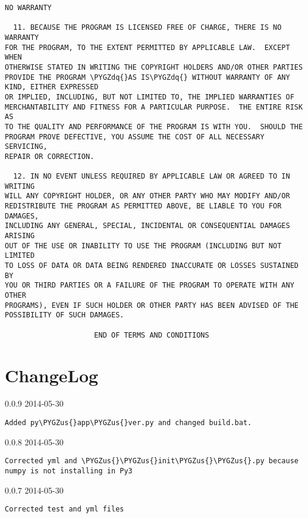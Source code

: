 \documentclass[letterpaper,10pt,english]{sphinxmanual}
\def\PYGZus{\char`\_}
\def\PYGZdq{\char`\"}
\begin{document}
\begin{Verbatim}[commandchars=\\\{\}]
                            NO WARRANTY

  11. BECAUSE THE PROGRAM IS LICENSED FREE OF CHARGE, THERE IS NO WARRANTY
FOR THE PROGRAM, TO THE EXTENT PERMITTED BY APPLICABLE LAW.  EXCEPT WHEN
OTHERWISE STATED IN WRITING THE COPYRIGHT HOLDERS AND/OR OTHER PARTIES
PROVIDE THE PROGRAM \PYGZdq{}AS IS\PYGZdq{} WITHOUT WARRANTY OF ANY KIND, EITHER EXPRESSED
OR IMPLIED, INCLUDING, BUT NOT LIMITED TO, THE IMPLIED WARRANTIES OF
MERCHANTABILITY AND FITNESS FOR A PARTICULAR PURPOSE.  THE ENTIRE RISK AS
TO THE QUALITY AND PERFORMANCE OF THE PROGRAM IS WITH YOU.  SHOULD THE
PROGRAM PROVE DEFECTIVE, YOU ASSUME THE COST OF ALL NECESSARY SERVICING,
REPAIR OR CORRECTION.

  12. IN NO EVENT UNLESS REQUIRED BY APPLICABLE LAW OR AGREED TO IN WRITING
WILL ANY COPYRIGHT HOLDER, OR ANY OTHER PARTY WHO MAY MODIFY AND/OR
REDISTRIBUTE THE PROGRAM AS PERMITTED ABOVE, BE LIABLE TO YOU FOR DAMAGES,
INCLUDING ANY GENERAL, SPECIAL, INCIDENTAL OR CONSEQUENTIAL DAMAGES ARISING
OUT OF THE USE OR INABILITY TO USE THE PROGRAM (INCLUDING BUT NOT LIMITED
TO LOSS OF DATA OR DATA BEING RENDERED INACCURATE OR LOSSES SUSTAINED BY
YOU OR THIRD PARTIES OR A FAILURE OF THE PROGRAM TO OPERATE WITH ANY OTHER
PROGRAMS), EVEN IF SUCH HOLDER OR OTHER PARTY HAS BEEN ADVISED OF THE
POSSIBILITY OF SUCH DAMAGES.

                     END OF TERMS AND CONDITIONS
\end{Verbatim}


\chapter{ChangeLog}
\label{changelog::doc}\label{changelog:changelog}
0.0.9 2014-05-30

\begin{Verbatim}[commandchars=\\\{\}]
Added py\PYGZus{}app\PYGZus{}ver.py and changed build.bat.
\end{Verbatim}

0.0.8 2014-05-30

\begin{Verbatim}[commandchars=\\\{\}]
Corrected yml and \PYGZus{}\PYGZus{}init\PYGZus{}\PYGZus{}.py because numpy is not installing in Py3
\end{Verbatim}

0.0.7 2014-05-30

\begin{Verbatim}[commandchars=\\\{\}]
Corrected test and yml files
\end{Verbatim}
\end{document}
